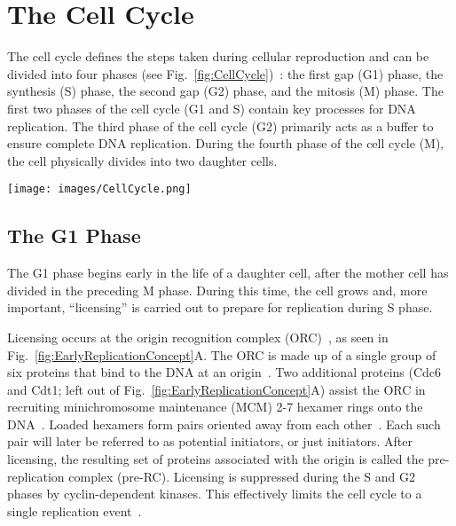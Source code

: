 	\section{The Cell Cycle}
	\label{sec:CellCycle}
	
	The cell cycle defines the steps taken during cellular reproduction and can be divided into four phases (see Fig.~\ref{fig:CellCycle})~\cite{MolecularCellBiology,CellMolApproach}:
	the first gap (G1) phase, the synthesis (S) phase, the second gap (G2) phase, and the mitosis (M) phase.
	The first two phases of the cell cycle (G1 and S) contain key processes for DNA replication.
	The third phase of the cell cycle (G2) primarily acts as a buffer to ensure complete DNA replication.
	During the fourth phase of the cell cycle (M), the cell physically divides into two daughter cells.
	
	\begin{SCfigure}[1][thb]
		\texttt{[image: images/CellCycle.png]}
		\caption[Cell Cycle]{\label{fig:CellCycle} The cell cycle has four phases: 
			Mitosis (M), when a mother cell separates into two daughter cells; 
			the first Gap (G1), when the daughter cell undergoes growth and chemical preparation for DNA replication;
			Synthesis (S), when the DNA is replicated;
			and the second Gap (G2), which acts as a buffer to ensure complete replication before the M phase.}
	\end{SCfigure}
	
	
		\subsection{The G1 Phase}
		\label{subsec:G1Phase}
		
		The G1 phase begins early in the life of a daughter cell, after the mother cell has divided in the preceding M phase.
		During this time, the cell grows and, more important, ``licensing'' is carried out to prepare for replication during S phase.
		
		Licensing occurs at the origin recognition complex (ORC)~\cite{DNAInitiation}, as seen in Fig.~\ref{fig:EarlyReplicationConcept}A.
		The ORC is made up of a single group of six proteins that bind to the DNA at an origin~\cite{ORC}.
		Two additional proteins (Cdc6 and Cdt1; left out of Fig.~\ref{fig:EarlyReplicationConcept}A) assist the ORC in recruiting minichromosome maintenance (MCM) 2-7 hexamer rings onto the DNA~\cite{DNARepInitiation}.
		Loaded hexamers form pairs oriented away from each other~\cite{MCMPairs}.
		Each such pair will later be referred to as potential initiators, or just initiators.
		After licensing, the resulting set of proteins associated with the origin is called the pre-replication complex (pre-RC).
		Licensing is suppressed during the S and G2 phases by cyclin-dependent kinases.
		This effectively limits the cell cycle to a single replication event~\cite{MolecularCellBiology}.
		
